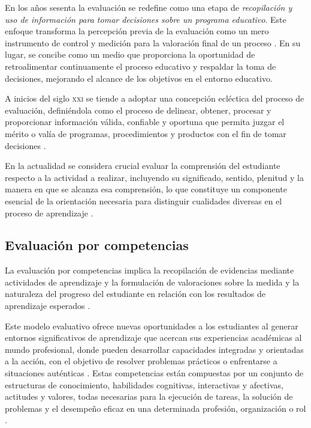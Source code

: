 En los años sesenta la evaluación se redefine como una etapa de \textit{recopilación y uso de información para tomar decisiones sobre un programa educativo}. Este enfoque transforma la percepción previa de la evaluación como un mero instrumento de control y medición para la valoración final de un proceso \cite{ref31_tyler}. En su lugar, se concibe como un medio que proporciona la oportunidad de retroalimentar continuamente el proceso educativo y respaldar la toma de decisiones, mejorando el alcance de los objetivos en el entorno educativo.

A inicios del siglo \textsc{xxi} se tiende a adoptar una concepción ecléctica del proceso de evaluación, definiéndola como el proceso de delinear, obtener, procesar y proporcionar información válida, confiable y oportuna que permita juzgar el mérito o valía de programas, procedimientos y productos con el fin de tomar decisiones \cite{ref32_scriven}.

En la actualidad se considera crucial evaluar la comprensión del estudiante respecto a la actividad a realizar, incluyendo su significado, sentido, plenitud y la manera en que se alcanza esa comprensión, lo que constituye un componente esencial de la orientación necesaria para distinguir cualidades diversas en el proceso de aprendizaje \cite{ref16_jonassen}.

\subsection{Evaluación por competencias}

La evaluación por competencias implica la recopilación de evidencias mediante actividades de aprendizaje y la formulación de valoraciones sobre la medida y la naturaleza del progreso del estudiante en relación con los resultados de aprendizaje esperados \cite{ref33_cano}.

Este modelo evaluativo ofrece nuevas oportunidades a los estudiantes al generar entornos significativos de aprendizaje que acercan sus experiencias académicas al mundo profesional, donde pueden desarrollar capacidades integradas y orientadas a la acción, con el objetivo de resolver problemas prácticos o enfrentarse a situaciones auténticas \cite{ref34_levy}. Estas competencias están compuestas por un conjunto de estructuras de conocimiento, habilidades cognitivas, interactivas y afectivas, actitudes y valores, todas necesarias para la ejecución de tareas, la solución de problemas y el desempeño eficaz en una determinada profesión, organización o rol \cite{ref33_cano,ref34_levy}.

